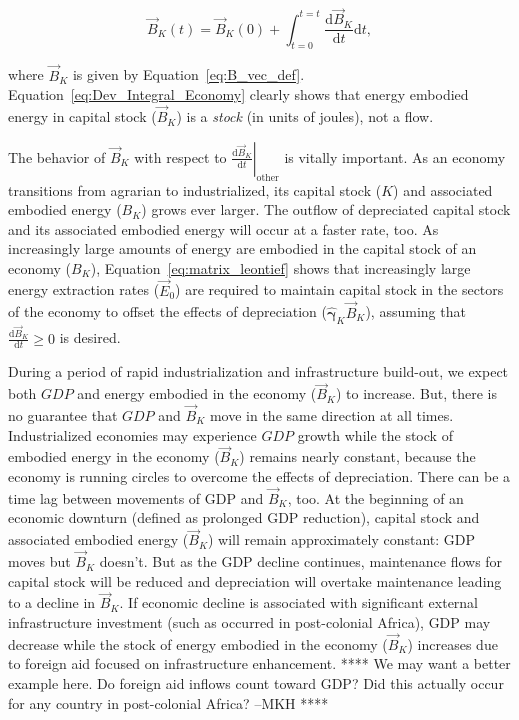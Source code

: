 \begin{equation} \label{eq:Dev_Integral_Economy}
	\vec{B}_{K}(t) 
	= \vec{B}_{K}(0) 
	+ \int_{t=0}^{t=t} \frac{\mathrm{d}\vec{B}_{K}}{\mathrm{d}t}\mathrm{d}t,
\end{equation}

\noindent{}where $\vec{B}_{K}$ is given by Equation~\ref{eq:B_vec_def}.
Equation~\ref{eq:Dev_Integral_Economy} clearly shows
that energy embodied energy in capital stock ($\vec{B}_{K}$) 
is a \emph{stock} (in units of joules), not a flow.

The behavior of $\vec{B}_{K}$ with respect to
$\left. \frac{\mathrm{d}\vec{B}_{K}}{\mathrm{d}t} \right|_{\mathrm{other}}$ 
is vitally important. 
As an economy transitions from agrarian to industrialized, 
its capital stock ($K$) and associated embodied energy ($B_{K}$)
grows ever larger. 
The outflow of depreciated capital stock and its associated embodied energy 
will occur at a faster rate, too.
As increasingly large amounts of energy are embodied 
in the capital stock of an economy ($B_{K}$), 
Equation~\ref{eq:matrix_leontief} shows that
increasingly large energy extraction rates ($\vec{E}_{0}$) 
are required to maintain capital stock 
in the sectors of the economy
to offset the effects of depreciation 
($\hat{\bm{\gamma}}_{K} \vec{B}_{K}$),
assuming that $\frac{\mathrm{d}\vec{B}_{K}}{\mathrm{d}t} \ge 0$ 
is desired. 

During a period of rapid industrialization and infrastructure build-out, 
we expect both $GDP$ and energy embodied in the economy ($\vec{B}_{K}$)
to increase.
But, there is no guarantee that $GDP$ and $\vec{B}_{K}$ move 
in the same direction at all times.
Industrialized economies may experience $GDP$ growth while 
the stock of embodied energy in the economy ($\vec{B}_{K}$) remains nearly constant,
because the economy is running circles to overcome the effects of depreciation.
There can be a time lag between movements of GDP and $\vec{B}_{K}$, too.
At the beginning of an economic downturn (defined as prolonged GDP reduction),
capital stock and associated embodied energy ($\vec{B}_{K}$) will remain approximately constant:
GDP moves but $\vec{B}_{K}$ doesn't.
But as the GDP decline continues, 
maintenance flows for capital stock will be reduced
and depreciation will overtake maintenance leading to a decline in $\vec{B}_{K}$. 
If economic decline is associated with significant external 
infrastructure investment (such as occurred in post-colonial Africa),
GDP may decrease 
while the stock of energy embodied in the economy ($\vec{B}_{K}$) increases 
due to foreign aid focused on infrastructure enhancement.
**** We may want a better example here.
Do foreign aid inflows count toward GDP\@?
Did this actually occur for any country in post-colonial Africa? 
--MKH ****

